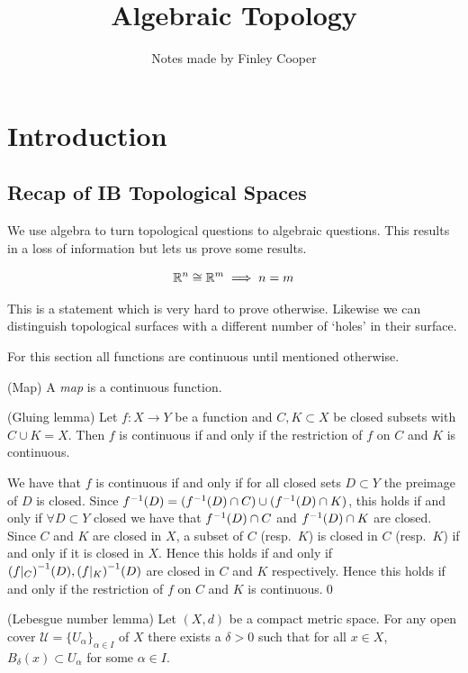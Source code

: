 \documentclass{article}
\title{Algebraic Topology}
\author{Notes made by Finley Cooper}
\begin{document}
  \maketitle
  \newpage
  \tableofcontents
  \newpage
  \section{Introduction}
  \subsection{Recap of IB Topological Spaces}
  We use algebra to turn topological questions to algebraic questions. This results in a loss of information but lets us prove some results.
  \begin{example}
    \[
	    \mathbb{R}^n \cong \mathbb{R}^m \implies n = m
    \]
  \end{example}
  This is a statement which is very hard to prove otherwise. Likewise we can distinguish topological surfaces with a different number of `holes' in their surface.
  \par
  For this section all functions are continuous until mentioned otherwise.
  \begin{definition}
	  (Map) A \textit{map} is a continuous function.
  \end{definition}
  \begin{lemma}
	  (Gluing lemma) Let $ f:X\to Y $ be a function and $ C, K\subset X$ be closed subsets with $ C\cup K = X $. Then $ f $ is continuous if and only if the restriction of $ f $ on $ C $ and $ K $ is continuous.
  \end{lemma}
  \pf We have that $ f $ is continuous if and only if for all closed sets $ D\subset Y $ the preimage of $ D $ is closed. Since $ {f}^{-1}(D) = ({f}^{-1}(D)\cap C)\cup({f}^{-1}(D)\cap K) $, this holds if and only if $ \forall D \subset Y $ closed we have that $ {f}^{-1}(D) \cap C $ and $ {f}^{-1}(D)\cap K $ are closed. Since $ C $ and $ K $ are closed in $ X $, a subset of $ C $ (resp.\ $ K $) is closed in $ C $ (resp.\ $ K $) if and only if it is closed in $ X $. Hence this holds if and only if $ {(f|_C)}^{-1}(D), {(f|_K)}^{-1}(D) $ are closed in $ C $ and $ K $ respectively. Hence this holds if and only if the restriction of $ f $ on $ C $ and $ K $ is continuous.\qed
  \begin{lemma}
	  (Lebesgue number lemma) Let $ (X,d) $ be a compact metric space. For any open cover $ \mathcal U = \{U_\alpha\}_{\alpha\in I} $ of $ X $ there exists a $ \delta > 0 $ such that for all $ x\in X $, $ B_\delta(x)\subset U_\alpha $ for some $ \alpha\in I $.
  \end{lemma}
\end{document}
